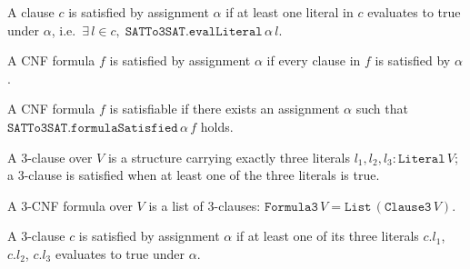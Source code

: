 \begin{definition}
\label{SATTo3SAT.clauseSatisfied}
\leanok
{}
A clause $c$ is satisfied by assignment $\alpha$ if at least one literal in $c$ evaluates
to true under $\alpha$, i.e.\ $\exists\, l \in c,\; \texttt{SATTo3SAT.evalLiteral}\,\alpha\,l$.
\end{definition}

\begin{definition}
\label{SATTo3SAT.formulaSatisfied}
\leanok
{}
A CNF formula $f$ is satisfied by assignment $\alpha$ if every clause in $f$ is satisfied
by $\alpha$.
\end{definition}

\begin{definition}
\label{SATTo3SAT.isSatisfiable}
\leanok
{}
A CNF formula $f$ is satisfiable if there exists an assignment $\alpha$ such that
$\texttt{SATTo3SAT.formulaSatisfied}\,\alpha\,f$ holds.
\end{definition}

\begin{definition}[3-clause]
\label{SATTo3SAT.Clause3}
\leanok
{}
A 3-clause over $V$ is a structure carrying exactly three literals $l_1, l_2, l_3 :
\mathtt{Literal}\,V$; a 3-clause is satisfied when at least one of the three literals is true.
\end{definition}

\begin{definition}
\label{SATTo3SAT.Formula3}
\leanok
{}
A 3-CNF formula over $V$ is a list of 3-clauses:
$\mathtt{Formula3}\,V = \mathtt{List}\,(\mathtt{Clause3}\,V)$.
\end{definition}

\begin{definition}
\label{SATTo3SAT.clause3Satisfied}
\leanok
{}
A 3-clause $c$ is satisfied by assignment $\alpha$ if at least one of its three literals
$c.l_1$, $c.l_2$, $c.l_3$ evaluates to true under $\alpha$.
\end{definition}

